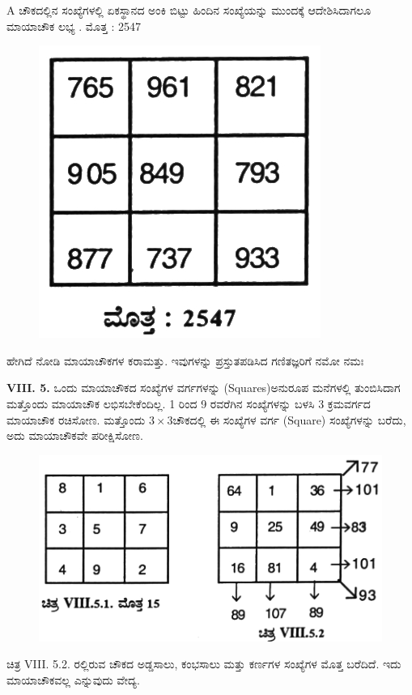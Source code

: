 A ಚೌಕದಲ್ಲಿನ ಸಂಖ್ಯೆಗಳಲ್ಲಿ ಏಕಸ್ಥಾನದ ಅಂಕಿ ಬಿಟ್ಟು ಹಿಂದಿನ ಸಂಖ್ಯೆಯನ್ನು ಮುಂದಕ್ಕೆ ಆದೇಶಿಸಿದಾಗಲೂ ಮಾಯಾಚೌಕ ಲಭ್ಯ . ಮೊತ್ತ : 2547
\begin{figure}[H]
\includegraphics{src/figures/chap7/fig7.15.jpg}
\end{figure}

ಹೇಗಿದೆ ನೋಡಿ ಮಾಯಾಚೌಕಗಳ ಕರಾಮತ್ತು. ಇವುಗಳನ್ನು ಪ್ರಸ್ತುತಪಡಿಸಿದ ಗಣಿತಜ್ಞರಿಗೆ ನಮೋ ನಮಃ

\textbf{VIII. 5.} ಒಂದು ಮಾಯಾಚೌಕದ ಸಂಖ್ಯೆಗಳ ವರ್ಗಗಳನ್ನು (Squares)ಅನುರೂಪ ಮನೆಗಳಲ್ಲಿ ತುಂಬಿಸಿದಾಗ ಮತ್ತೊಂದು ಮಾಯಾಚೌಕ ಲಭಿಸಬೇಕೆಂದಿಲ್ಲ. 1 ರಿಂದ 9 ರವರೆಗಿನ ಸಂಖ್ಯೆಗಳನ್ನು ಬಳಸಿ 3 ಕ್ರಮವರ್ಗದ ಮಾಯಾಚೌಕ ರಚಿಸೋಣ. ಮತ್ತೊಂದು $3 \times 3$ಚೌಕದಲ್ಲಿ ಈ ಸಂಖ್ಯೆಗಳ ವರ್ಗ (Square) ಸಂಖ್ಯೆಗಳನ್ನು ಬರೆದು, ಅದು ಮಾಯಾಚೌಕವೇ ಪರೀಕ್ಷಿಸೋಣ.
\begin{figure}[H]
\includegraphics{src/figures/chap7/fig7.16.jpg}
\end{figure}

ಚಿತ್ರ VIII. 5.2. ರಲ್ಲಿರುವ ಚೌಕದ ಅಡ್ಡಸಾಲು, ಕಂಭಸಾಲು ಮತ್ತು ಕರ್ಣಗಳ ಸಂಖ್ಯೆಗಳ ಮೊತ್ತ ಬರೆದಿದೆ. ಇದು ಮಾಯಾಚೌಕವಲ್ಲ ಎನ್ನುವುದು ವೇದ್ಯ.


